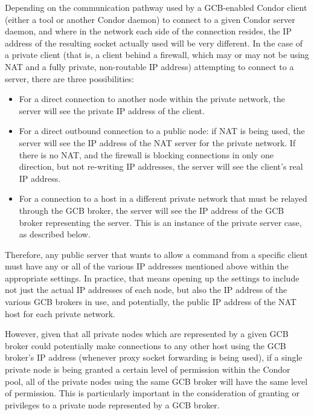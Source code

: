 Depending on the communication pathway used by a GCB-enabled Condor
client (either a tool or another Condor daemon) to connect to a given
Condor server daemon, and where in the network each side of the
connection resides, the IP address of the resulting socket actually
used will be very different.
In the case of a private client (that is, a client behind a firewall,
which may or may not be using NAT and a fully private, non-routable IP
address) attempting to connect to a server, there are three
possibilities: 

\begin{itemize}

  \item For a direct connection to another node within the private network,
  the server will see the private IP address of the client.

  \item For a direct outbound connection to a public node: if NAT is being
  used, the server will see the IP address of the NAT server for the private
  network.
  If there is no NAT, and the firewall is blocking connections in
  only one direction, but not re-writing IP addresses, the server will see
  the client's real IP address.

  \item For a connection to a host in a different private network that must
  be relayed through the GCB broker, the server will see the IP
  address of the GCB broker representing the server.
  This is an instance of the private server case, as
  described below.

\end{itemize}

Therefore, any public server that wants to allow a command from a
specific client must have any or all of the various IP addresses
mentioned above within the appropriate  settings.  In
practice, that means opening up the  settings to
include not just the actual IP addresses of each node, but also the IP
address of the various GCB brokers in use, and potentially, the public
IP address of the NAT host for each private network.

However, given that all private nodes which are represented by a
given GCB broker could potentially make connections to any other
host using the GCB broker's IP address (whenever proxy socket
forwarding is being used), if a single private node is being granted
a certain level of permission within the Condor pool,
all of the private nodes
using the same GCB broker will have the same level of permission.
This is particularly important in the consideration of granting
 or 
privileges to a private node represented by a GCB broker.

